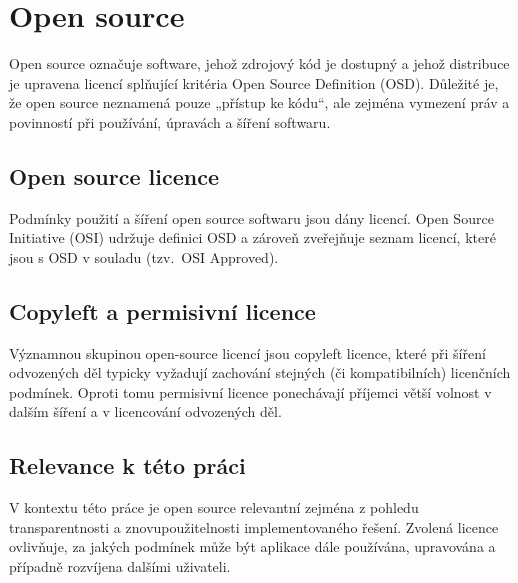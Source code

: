 \section{Open source}

Open source označuje software, jehož zdrojový kód je dostupný a jehož distribuce je upravena licencí splňující kritéria Open Source Definition (OSD). Důležité je, že open source neznamená pouze „přístup ke kódu“, ale zejména vymezení práv a povinností při používání, úpravách a šíření softwaru. \parencite{OpenSourceDefinition,OpenSource2024}

\FloatBarrier
\subsection{Open source licence}
Podmínky použití a šíření open source softwaru jsou dány licencí. Open Source Initiative (OSI) udržuje definici OSD a zároveň zveřejňuje seznam licencí, které jsou s OSD v souladu (tzv.~OSI Approved). \parencite{OpenSourceDefinition,OSILicenses}

\FloatBarrier
\subsection{Copyleft a permisivní licence}
Významnou skupinou open-source licencí jsou copyleft licence, které při šíření odvozených děl typicky vyžadují zachování stejných (či kompatibilních) licenčních podmínek. Oproti tomu permisivní licence ponechávají příjemci větší volnost v dalším šíření a v licencování odvozených děl. \parencite{Copyleft2026}

\FloatBarrier
\subsection{Relevance k této práci}
V kontextu této práce je open source relevantní zejména z pohledu transparentnosti a znovupoužitelnosti implementovaného řešení. Zvolená licence ovlivňuje, za jakých podmínek může být aplikace dále používána, upravována a případně rozvíjena dalšími uživateli.



